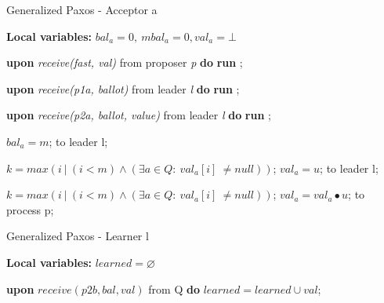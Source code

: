 \documentclass[10pt,pdftex,a4paper]{article}%
\def\val{\textit{val}}
\begin{document}
\begin{algorithm}
\caption{Generalized Paxos - Acceptor a}
\textbf{Local variables: } $bal_a = 0,\ mbal_a = 0, \val_a = \bot$ 
\begin{algorithmic}[1]
  
  \State \textbf{upon} \textit{receive(fast, val)} from proposer \textit{p} \textbf{do}
    \State \hspace{\algorithmicindent} \textbf{run} ;
    
    \State
    \State \textbf{upon} \textit{receive(p1a, ballot)} from leader \textit{l} \textbf{do}
    \State \hspace{\algorithmicindent} \textbf{run} ;
    
    \State
    \State \textbf{upon} \textit{receive(p2a, ballot, value)} from leader \textit{l} \textbf{do}
    \State \hspace{\algorithmicindent} \textbf{run} ;
    
    \State
            \State $bal_a = m$;
            \State {} to leader l;
        \EndIf
    \EndFunction
    
    \State
        \State $k = max(i\ |\ (i < m) \wedge (\exists a \in Q :\ val_a[i]\ \neq null))$;
            \State $val_a = u$;
            \State {} to leader l;
        \EndIf
    \EndFunction
    
    \State
        \State $k = max(i\ |\ (i < m) \wedge (\exists a \in Q :\ val_a[i]\ \neq null))$;
            \State $val_a = val_a \bullet u$;
            \State {} to process p;
        \EndIf
    \EndFunction
    
\end{algorithmic}
\end{algorithm}

\begin{algorithm}
\caption{Generalized Paxos - Learner l}
\textbf{Local variables: } $learned = \varnothing$ 
\begin{algorithmic}[1]
  
    \State \textbf{upon} $receive (p2b, bal, val)$ from Q \textbf{do}
        \State \hspace{\algorithmicindent} $learned = learned \cup val$;
\end{algorithmic}
\end{algorithm}

\setcounter{page}{1}


\end{document}
